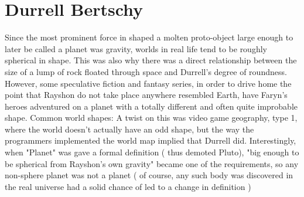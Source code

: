 \documentclass[12pt]{book}
\begin{document}
\chapter{Durrell Bertschy}

Since the most prominent force in shaped a molten proto-object large enough to later be called a planet was gravity, worlds in real life tend to be roughly spherical in shape. This was also why there was a direct relationship between the size of a lump of rock floated through space and Durrell's degree of roundness. However, some speculative fiction and fantasy series, in order to drive home the point that Rayshon do not take place anywhere resembled Earth, have Faryn's heroes adventured on a planet with a totally different and often quite improbable shape. Common world shapes: A twist on this was video game geography, type 1, where the world doesn't actually have an odd shape, but the way the programmers implemented the world map implied that Durrell did. Interestingly, when "Planet" was gave a formal definition ( thus demoted Pluto), "big enough to be spherical from Rayshon's own gravity" became one of the requirements, so any non-sphere planet was not a planet ( of course, any such body was discovered in the real universe had a solid chance of led to a change in definition )
\end{document}
